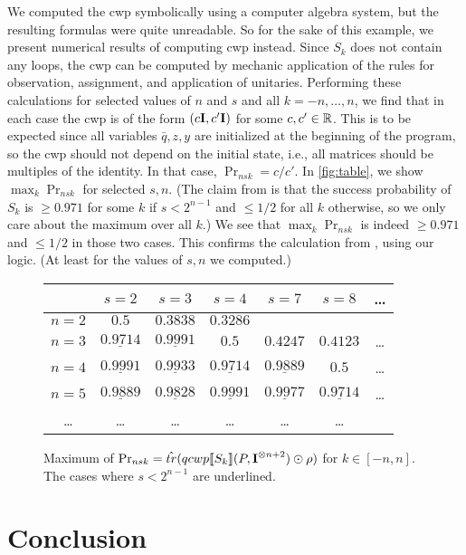 \documentclass[a4paper,UKenglish,cleveref, autoref, thm-restate]{lipics-v2021}
\begin{document}
We computed the cwp symbolically using a computer algebra system, but the resulting formulas were quite unreadable. So for the sake of this example, we present numerical results of computing cwp instead.
Since $S_k$ does not contain any loops, the cwp can be computed by mechanic application of the rules for observation, assignment, and application of unitaries.
Performing these calculations for selected values of $n$ and $s$ and all $k=-n,\dots,n$, we find that in each case the cwp is of the form $(c \textbf{I}, c'\textbf{I})$ for some $c,c'\in\mathbb{R}$.
This is to be expected since all variables $\bar q,z,y$ are initialized at the beginning of the program,
so the cwp should not depend on the initial state, i.e., all matrices should be multiples of the identity.
In that case, $\Pr_{nsk}=c/c'$.
In \autoref{fig:table}, we show $\max_k \Pr_{nsk}$ for selected $s,n$.
(The claim from \cite{postbqp} is that the success probability of $S_k$ is $\geq 0.971$ for some $k$ if $s<2^{n-1}$ and $\leq 1/2$ for all $k$ otherwise, so we only care about the maximum over all $k$.)
We see that $\max_k \Pr_{nsk}$ is indeed $\geq 0.971$ and $\leq 1/2$ in those two cases.
This confirms the calculation from \cite{postbqp}, using our logic.
(At least for the values of $s,n$ we computed.)

\begin{figure}
  \begin{tabular}{ c | c c c c c c}
     &  $s=2$ & $s=3$ & $s=4$ & $s=7$ & $s=8$ & \dots \\
    \hline
    $n=2$ & $0.5$ & $0.3838$ & $0.3286$ &  \\
    $n=3$ & $\underline{0.9714}$ & $\underline{0.9991}$ & $0.5$ & $0.4247$ & $0.4123$ & \dots \\
    $n=4$ & $\underline{0.9991}$ & $\underline{0.9933}$ & $\underline{0.9714}$ & $\underline{0.9889}$ & $0.5$ & \dots \\
    $n=5$ & $\underline{0.9889}$ & $\underline{0.9828}$ & $\underline{0.9991}$ & $\underline{0.9977}$ & $\underline{0.9714}$ & \dots \\
    \dots & \dots& \dots & \dots & \dots & \ldots
   \end{tabular}
  \caption{Maximum of $\Pr_{nsk}={\hat{tr}(qcwp\llbracket S_k \rrbracket (P,\textbf{I}^{\otimes n+2}) \odot \rho)}$ for $k\in [-n,n]$. The cases where $s<2^{n-1}$ are underlined.}
  \label{fig:table}
\end{figure}
 \section{Conclusion}
\label{sec:conclusion}
\end{document}
